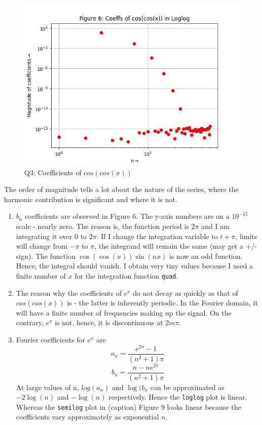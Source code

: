 \documentclass[11pt, a4paper]{article}
\begin{document}
   
  \begin{figure}[!tbh]
   	\centering 
  \includegraphics[scale=0.5]{q3-f2-loglog.png} 
    \caption{Q3: Coefficients of $cos(cos(x))$}
   	\label{fig:Q3-f2-loglog}
   \end{figure}

   The order of magnitude tells a lot about the nature of the series, where the harmonic contribution is significant and where it is not.
   \begin{enumerate}
   \item $b_{n}$ coefficients are observed in Figure 6. The y-axis numbers are on a $10^{-15}$ scale - nearly zero. The reason is, the function period is $2\pi$ and I am integrating it over 0 to $2\pi$. If I change the integration variable to $t+\pi$, limits will change from $-\pi$ to $\pi$, the integrand will remain the same (may get a +/- sign). The function $\cos(\cos(x))\sin(nx)$ is now an odd function. Hence, the integral should vanish. I obtain very tiny values because I used a finite number of $x$ for the integration function \texttt{quad}.  
   \item The reason why the coefficients of $e^x$ do not decay as quickly as that of $cos(cos(x))$ is - the latter is inherently periodic. In the Fourier domain, it will have a finite number of frequencies making up the signal. On the contrary, $e^x$ is not, hence, it is discontinuous at $2m\pi$.
   \item Fourier coefficients for $e^x$ are 
   $$a_{n}=\frac{e^{2\pi}-1}{(n^2+1)\pi}$$ 
   $$b_{n}=\frac{n-n{e^{2\pi}}}{(n^2+1)\pi}$$ 
   At large values of n, $log(a_{n})$ and $\log(b_{n}$ can be approximated as $-2\log(n)$ and $-\log(n)$ respectively. Hence the \texttt{loglog} plot is linear. Whereas the \texttt{semilog} plot in (caption) Figure 9 looks linear because the coefficients vary approximately as exponential $n$. 
    
   \end{enumerate}
   
\end{document}
